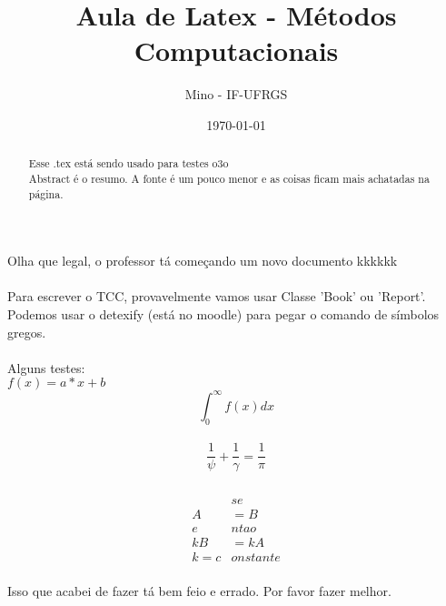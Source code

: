 \documentclass[a4paper,12pt]{article}
\title{Aula de Latex - Métodos Computacionais}
\author{Mino - IF-UFRGS}
\date{\today}
\begin{document}
\maketitle
\thispagestyle{myfancy}
\begin{abstract}
	Esse .tex está sendo usado para testes o3o
	\\Abstract é o resumo. A fonte é um pouco menor
	e as coisas ficam mais achatadas na página.
\end{abstract}

Olha que legal, o professor tá começando um novo documento kkkkkk
\\
\\Para escrever o TCC, provavelmente vamos usar Classe 'Book' ou 'Report'.
\\Podemos usar o detexify (está no moodle) para pegar o comando de símbolos gregos.
\\
\\Alguns testes:
\\
$f(x) = a*x + b$
\\
\begin{equation}
	\int_{0}^{\infty}f(x)dx
	\label{eq1}
\end{equation}
\\
\[\frac{1}{\psi} + \frac{1}{\gamma} = \frac{1}{\pi}\]
\\
\begin{align*}
\\&se
\\A &= B
\\ e&ntao
\\kB &= kA
\\k = c&onstante
\end{align*}
\\Isso que acabei de fazer tá bem feio e errado. Por favor fazer melhor.
\end{document}
